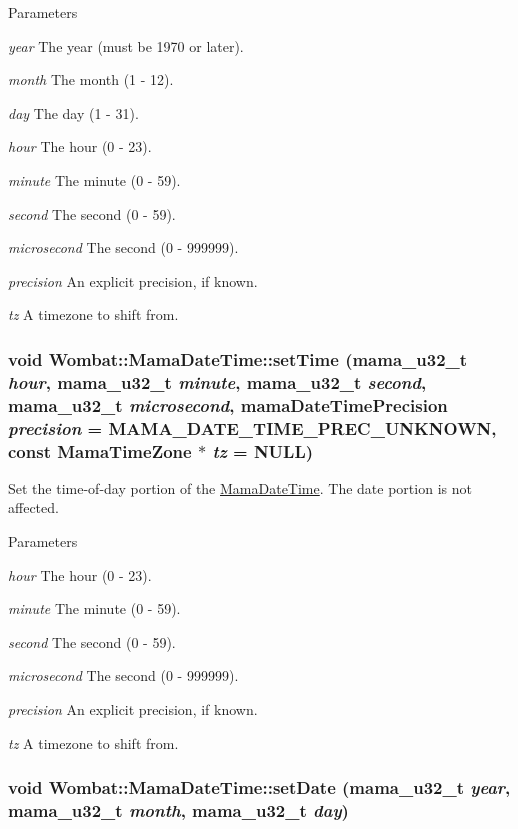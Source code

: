 \begin{DoxyParams}{Parameters}
\item[{\em year}]The year (must be 1970 or later). \item[{\em month}]The month (1 -\/ 12). \item[{\em day}]The day (1 -\/ 31). \item[{\em hour}]The hour (0 -\/ 23). \item[{\em minute}]The minute (0 -\/ 59). \item[{\em second}]The second (0 -\/ 59). \item[{\em microsecond}]The second (0 -\/ 999999). \item[{\em precision}]An explicit precision, if known. \item[{\em tz}]A timezone to shift from. \end{DoxyParams}
\hypertarget{classWombat_1_1MamaDateTime_ae0b8725d6dfac55b09096be914116b02}{
\subsubsection[{setTime}]{\setlength{\rightskip}{0pt plus 5cm}void Wombat::MamaDateTime::setTime (mama\_\-u32\_\-t {\em hour}, \/  mama\_\-u32\_\-t {\em minute}, \/  mama\_\-u32\_\-t {\em second}, \/  mama\_\-u32\_\-t {\em microsecond}, \/  mamaDateTimePrecision {\em precision} = {\ttfamily MAMA\_\-DATE\_\-TIME\_\-PREC\_\-UNKNOWN}, \/  const {\bf MamaTimeZone} $\ast$ {\em tz} = {\ttfamily NULL})}}
\label{classWombat_1_1MamaDateTime_ae0b8725d6dfac55b09096be914116b02}


Set the time-\/of-\/day portion of the \hyperlink{classWombat_1_1MamaDateTime}{MamaDateTime}. The date portion is not affected.


\begin{DoxyParams}{Parameters}
\item[{\em hour}]The hour (0 -\/ 23). \item[{\em minute}]The minute (0 -\/ 59). \item[{\em second}]The second (0 -\/ 59). \item[{\em microsecond}]The second (0 -\/ 999999). \item[{\em precision}]An explicit precision, if known. \item[{\em tz}]A timezone to shift from. \end{DoxyParams}
\hypertarget{classWombat_1_1MamaDateTime_a8ea1490eef66b2103665b89070ff5b3c}{
\subsubsection[{setDate}]{\setlength{\rightskip}{0pt plus 5cm}void Wombat::MamaDateTime::setDate (mama\_\-u32\_\-t {\em year}, \/  mama\_\-u32\_\-t {\em month}, \/  mama\_\-u32\_\-t {\em day})}}
\label{classWombat_1_1MamaDateTime_a8ea1490eef66b2103665b89070ff5b3c}


